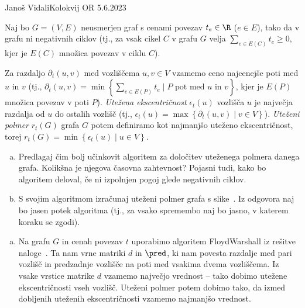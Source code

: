 \begin{naloga}{Janoš Vidali}{Kolokvij OR 5.6.2023}
\begin{vprasanje}
Naj bo $G = (V, E)$ neusmerjen graf s cenami povezav $t_e \in \R$ ($e \in E$),
tako da v grafu ni negativnih ciklov
(tj., za vsak cikel $C$ v grafu $G$ velja $\sum_{e \in E(C)} t_e \ge 0$,
kjer je $E(C)$ množica povezav v ciklu $C$).

Za razdaljo $\partial_t(u, v)$ med vozliščema $u, v \in V$ vzamemo
ceno najcenejše poti med $u$ in $v$
(tj.,
$\partial_t(u, v) = \min\left\{\sum_{e \in E(P)} t_e
\mid \text{$P$ pot med $u$ in $v$}\right\}$,
kjer je $E(P)$ množica povezav v poti $P$).
{\em Utežena ekscentričnost} $\epsilon_t(u)$ vozlišča $u$
je največja razdalja od $u$ do ostalih vozlišč
(tj., $\epsilon_t(u) = \max\left\{\partial_t(u, v) \mid v \in V\right\}$).
{\em Uteženi polmer} $r_t(G)$ grafa $G$ potem definiramo kot
najmanjšo uteženo ekscentričnost,
torej $r_t(G) = \min\left\{\epsilon_t(u) \mid u \in V\right\}$.

\begin{enumerate}[(a)]
\item Predlagaj čim bolj učinkovit algoritem
za določitev uteženega polmera danega grafa.
Kolikšna je njegova časovna zahtevnost?
Pojasni tudi, kako bo algoritem deloval,
če ni izpolnjen pogoj glede negativnih ciklov.

\item S svojim algoritmom izračunaj uteženi polmer grafa s slike~\fig.
Iz odgovora naj bo jasen potek algoritma
(tj., za vsako spremembo naj bo jasno, v katerem koraku se zgodi).
\end{enumerate}

\begin{slika}
\pgfslika
{}
\end{slika}
\end{vprasanje}

\begin{odgovor}
\begin{enumerate}[(a)]
\item Na grafu $G$ in cenah povezav $t$
uporabimo algoritem {\sc FloydWarshall} iz rešitve naloge~\res[fw].
Ta nam vrne matriki $d$ in $\pred$,
ki nam povesta razdalje med pari vozlišč
in predzadnje vozlišče na poti med vsakima dvema vozliščema.
Iz vsake vrstice matrike $d$ vzamemo največjo vrednost
-- tako dobimo utežene ekscentričnosti vseh vozlišč.
Uteženi polmer potem dobimo tako,
da izmed dobljenih uteženih ekscentričnosti vzamemo najmanjšo vrednost.


\end{enumerate}
\end{odgovor}
\end{naloga}
